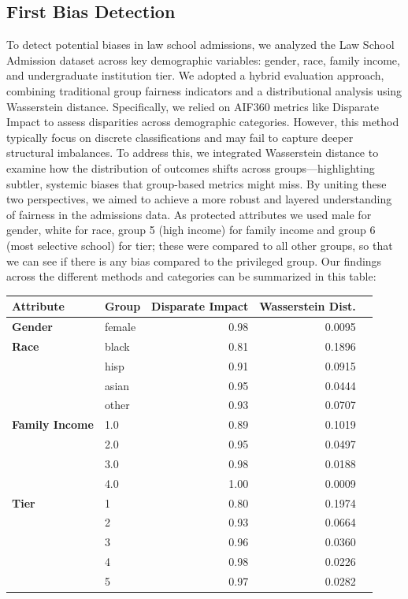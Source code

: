 \documentclass{article}
\begin{document}
\subsection{First Bias Detection}
To detect potential biases in law school admissions, we analyzed the Law School Admission dataset across key demographic variables: gender, race, family income, and undergraduate institution tier. We adopted a hybrid evaluation approach, combining traditional group fairness indicators and a distributional analysis using Wasserstein distance. Specifically, we relied on AIF360 metrics like Disparate Impact to assess disparities across demographic categories. However, this method typically focus on discrete classifications and may fail to capture deeper structural imbalances. To address this, we integrated Wasserstein distance to examine how the distribution of outcomes shifts across groups—highlighting subtler, systemic biases that group-based metrics might miss. By uniting these two perspectives, we aimed to achieve a more robust and layered understanding of fairness in the admissions data. As protected attributes we used male for gender, white for race, group 5 (high income) for family income and group 6 (most selective school) for tier; these were compared to all other groups, so that we can see if there is any bias compared to the privileged group. Our findings across the different methods and categories can be summarized in this table:

\begin{center}
\begin{tabular}{llrrr}
\toprule
Attribute & Group & Disparate Impact & Wasserstein Dist. \\
\midrule
\textbf{Gender}
& female & 0.98 & 0.0095 \\
\midrule
\textbf{Race}
& black & 0.81 & 0.1896 \\
& hisp & 0.91 & 0.0915 \\
& asian & 0.95 & 0.0444 \\
& other & 0.93 &  0.0707 \\
\midrule
\textbf{Family Income}
& 1.0 & 0.89 & 0.1019 \\
& 2.0 & 0.95 & 0.0497 \\
& 3.0 & 0.98 & 0.0188 \\
& 4.0 & 1.00 & 0.0009 \\
\midrule
\textbf{Tier}
& 1 & 0.80 & 0.1974 \\
& 2 & 0.93 & 0.0664 \\
& 3 & 0.96 & 0.0360 \\
& 4 & 0.98 & 0.0226 \\
& 5 & 0.97 & 0.0282 \\
\bottomrule
\end{tabular}
\label{tab:fairness_initial_detection}
\end{center}
\end{document}
